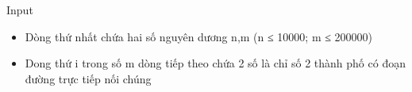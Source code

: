 Input
\begin{itemize}
	\item Dòng thứ nhất chứa hai số nguyên dương n,m (n ≤ 10000; m ≤ 200000)
	\item Dong thứ i trong số m dòng tiếp theo chứa 2 số là chỉ số 2 thành phố có đoạn đường trực tiếp nối chúng
\end{itemize}